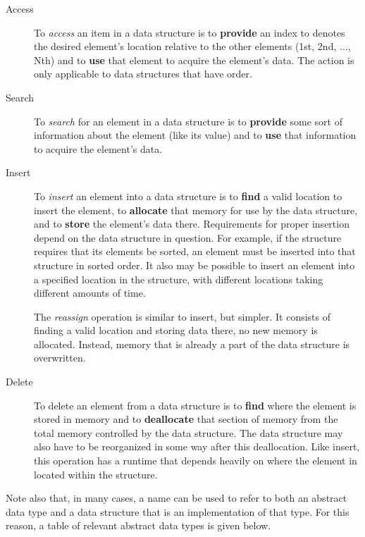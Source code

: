 \vspace{4mm}
\begin{description}
    \item[Access] To \textit{access} an item in a data structure is to \textbf{provide} an index to denotes the desired element's location relative to the other elements (1st, 2nd, ..., Nth) and to \textbf{use} that element to acquire the element's data. The action is only applicable to data structures that have order.
    \item[Search] To \textit{search} for an element in a data structure is to \textbf{provide} some sort of information about the element (like its value) and to \textbf{use} that information to acquire the element's data.
    \item[Insert] To \textit{insert} an element into a data structure is to \textbf{find} a valid location to insert the element, to \textbf{allocate} that memory for use by the data structure, and to \textbf{store} the element's data there. Requirements for proper insertion depend on the data structure in question. For example, if the structure requires that its elements be sorted, an element must be inserted into that structure in sorted order. It also may be possible to insert an element into a specified location in the structure, with different locations taking different amounts of time.

    The \textit{reassign} operation is similar to insert, but simpler. It consists of finding a valid location and storing data there, no new memory is allocated. Instead, memory that is already a part of the data structure is overwritten.
    \item[Delete] To delete an element from a data structure is to \textbf{find} where the element is stored in memory and to \textbf{deallocate} that section of memory from the total memory controlled by the data structure. The data structure may also have to be reorganized in some way after this deallocation. Like insert, this operation has a runtime that depends heavily on where the element in located within the structure.
\end{description}
\vspace{5mm}

Note also that, in many cases, a name can be used to refer to both an abstract data type and a data structure that is an implementation of that type. For this reason, a table of relevant abstract data types is given below.

